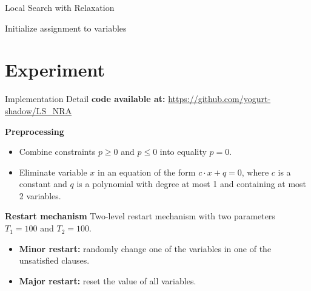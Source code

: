 \begin{frame}{Local Search with Relaxation}
    \scriptsize
    \begin{algorithm}[H]
\label{alg:relax}
Initialize assignment to variables\; 
    \end{algorithm}
\end{frame}

\section{Experiment}

\begin{frame}{Implementation Detail}
    \textbf{code available at:} \url{https://github.com/yogurt-shadow/LS_NRA}

    \textbf{Preprocessing} 
    \begin{itemize}
        \item Combine constraints $p\ge 0$ and $p\le 0$ into equality $p=0$.
        \item Eliminate variable $x$ in an equation of the form $c\cdot x+q=0$, where $c$ is a constant and $q$ is a polynomial with degree at most 1 and containing at most 2 variables.
    \end{itemize}

    \textbf{Restart mechanism} Two-level restart mechanism with two parameters $T_1 = 100$ and $T_2 = 100$.

    \begin{itemize}
        \item \textbf{Minor restart:} randomly change one of the variables in one of the unsatisfied clauses.
        \item \textbf{Major restart:} reset the value of all variables.
    \end{itemize}
\end{frame}

